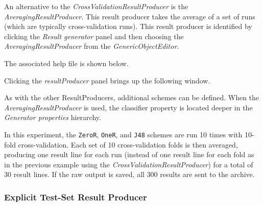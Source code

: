 An alternative to the \textit{CrossValidationResultProducer} is the \textit{AveragingResultProducer}. This result producer takes the average of a set of runs (which are typically cross-validation runs). This result producer is identified by clicking the \textit{Result generator} panel and then choosing the \textit{AveragingResultProducer} from the \textit{GenericObjectEditor}.
\begin{center}
\end{center}

The associated help file is shown below.
\begin{center}
\end{center}

Clicking the \textit{resultProducer} panel brings up the following window.
\begin{center}
\end{center}

As with the other ResultProducers, additional schemes can be defined. When the \textit{AveragingResultProducer} is used, the classifier property is located deeper in the \textit{Generator properties} hierarchy.
\begin{center}
\end{center}
	
\begin{center}
\end{center}

In this experiment, the \texttt{ZeroR}, \texttt{OneR}, and \texttt{J48} schemes are run 10 times with 10-fold cross-validation. Each set of 10 cross-validation folds is then averaged, producing one result line for each run (instead of one result line for each fold as in the previous example using the \textit{CrossValidationResultProducer}) for a total of 30 result lines. If the raw output is saved, all 300 results are sent to the archive.
\begin{center}
\end{center}


\subsubsection*{Explicit Test-Set Result Producer}

